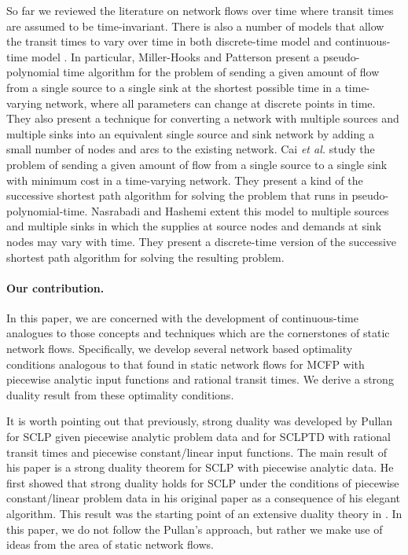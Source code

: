 \documentclass{svjour3}                     \smartqed
\begin{document}
So far we reviewed the literature on network flows over time where transit times are assumed to be time-invariant. There is also a number of models that allow the transit times to vary over time in both discrete-time model \cite{CaiKloksWong97,CaiShaWong01,Miller-HooksPatterson04,Miller-HooksPatterson04,Opasanon06,Miller98,NasrHash10,Wen2013} and continuous-time model \cite{HashNasr11,Orda90,Orda91,OrdaRom95}. In particular, Miller-Hooks and Patterson \cite{Miller-HooksPatterson04} present a pseudo-polynomial time algorithm for the problem of sending a given amount of flow from a single source to a single sink at the shortest possible time in a time-varying network, where all parameters can change at discrete points in time. They also present a technique for converting a network with multiple sources and multiple sinks into an equivalent single source and sink network by adding a small number of nodes and arcs to the existing network. Cai \emph{et al.} \cite{CaiShaWong01} study the problem of sending a given amount of flow from a single source to a single sink with minimum cost in a time-varying network. They present a kind of the successive shortest path algorithm for solving the problem that runs in pseudo-polynomial-time. Nasrabadi and Hashemi \cite{NasrHash10} extent this model to multiple sources and multiple sinks in which the supplies at source nodes and demands at sink nodes may vary with time. They present a discrete-time version of the successive shortest
path algorithm for solving the resulting problem. 





\paragraph{Our contribution.}
In this paper, we are concerned with the development of continuous-time analogues to those concepts and techniques which are the cornerstones of static network flows. Specifically, we develop several network based optimality conditions analogous to that found in static network flows for MCFP with piecewise analytic input functions and rational transit times. We derive a strong duality result from these optimality conditions. 

It is worth pointing out that previously, strong duality was developed by Pullan \cite{Pullan96,Pullan97} for SCLP given piecewise analytic problem data and for SCLPTD with rational transit times and piecewise constant/linear input functions. The main result of his paper is a strong duality theorem for SCLP with piecewise analytic data. He first showed that strong duality holds for SCLP under the conditions of piecewise constant/linear problem data in his original paper \cite{Pullan93} as a consequence of his elegant algorithm. This result was the starting point of an extensive duality theory in \cite{Pullan96}. In this paper, we do not follow the Pullan's approach, but rather we make use of ideas from the area of static network flows. 
\end{document}
